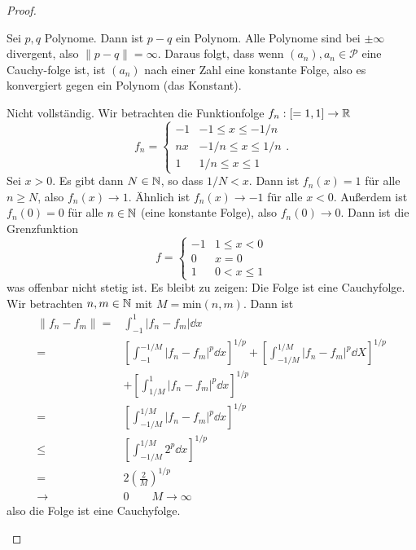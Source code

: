 \begin{proof}
\begin{parts}
		Sei $p,q$ Polynome. Dann ist $p-q$ ein Polynom. Alle Polynome sind bei $\pm\infty$ divergent, also $\|p-q\|=\infty$. Daraus folgt, dass wenn $(a_n),a_n\in \mathcal{P}$ eine Cauchy-folge ist, ist $(a_n)$ nach einer Zahl eine konstante Folge, also es konvergiert gegen ein Polynom (das Konstant).
	\item Nicht vollständig. Wir betrachten die Funktionfolge $f_n:[=1,1]\to \mathbb{R}$
		\[
		f_n=\begin{cases}
			-1 & -1 \le x \le - 1 / n\\
			n x & - 1 / n\le x \le 1 / n\\
			1 & 1 / n \le x \le 1
		\end{cases}
		.\] 
		Sei $x>0$. Es gibt dann $N\in \mathbb{N}$, so dass $1 / N < x$. Dann ist $f_n(x)=1$ f\"{u}r alle $n\ge N$, also $f_n(x)\to 1$. Ähnlich ist $f_n(x)\to -1$ f\"{u}r alle $x<0$. Außerdem ist $f_n(0)=0$ f\"{u}r alle $n\in \mathbb{N}$ (eine konstante Folge), also $f_n(0)\to 0$. Dann ist die Grenzfunktion
		\[
		f=\begin{cases}
			-1 & 1 \le x < 0\\
			0 & x = 0\\
			1 & 0 < x \le 1
		\end{cases}
		\]
		was offenbar nicht stetig ist. Es bleibt zu zeigen: Die Folge ist eine Cauchyfolge. Wir betrachten $n,m\in \mathbb{N}$ mit $M=\text{min}(n,m)$. Dann ist
		\begin{align*}
			\|f_n-f_m\|=&\int_{-1}^1 |f_n-f_m|\dd{x}\\
			=&\left[\int_{-1}^{-1 / M}|f_n-f_m|^p\dd{x}\right]^{1 / p}+\left[\int_{-1 / M}^{1 / M}|f_n-f_m|^p\dd{X}\right]^{1 / p}\\
			 &+\left[\int_{1 / M}^1 |f_n-f_m|^p\dd{x}\right]^{1 / p}\\
			=&\left[\int_{-1 / M}^{1 / M}|f_n-f_m|^p\dd{x}\right]^{1 / p}\\
			\le&\left[ \int_{-1 / M}^{1 / M}2^p\dd{x} \right] ^{1 / p}\\
			=&2\left( \frac{2}{M} \right)^{1 / p}\\
			\to& 0 \qquad M\to \infty
		\end{align*}
		also die Folge ist eine Cauchyfolge.\qedhere
	\end{parts}
\end{proof}
